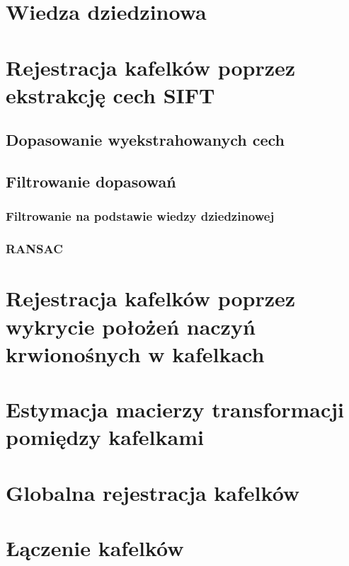 \section{Wiedza dziedzinowa}
\label{sec:proponowane_algorytmy:wiedza_dziedzinowa}


\section{Rejestracja kafelków poprzez ekstrakcję cech SIFT}
\label{sec:proponowane_algorytmy:sift}

\subsection{Dopasowanie wyekstrahowanych cech}
\label{sec:proponowane_algorytmy:filtrowanie}

\subsection{Filtrowanie dopasowań}
\label{sec:proponowane_algorytmy:filtrowanie}

\subsubsection{Filtrowanie na podstawie wiedzy dziedzinowej}
\label{sec:proponowane_algorytmy:filtrowanie_dziedzinowe}

\subsubsection{RANSAC}
\label{sec:proponowane_algorytmy:ransac}

\section{Rejestracja kafelków poprzez wykrycie położeń naczyń krwionośnych w kafelkach}
\label{sec:proponowane_algorytmy:depth_first_search}

\section{Estymacja macierzy transformacji pomiędzy kafelkami}
\label{sec:proponowane_algorytmy:estymacja}

\section{Globalna rejestracja kafelków}
\label{sec:proponowane_algorytmy:globalna_rejestracja}

\section{Łączenie kafelków}
\label{sec:proponowane_algorytmy:laczenie_kafelkow}

